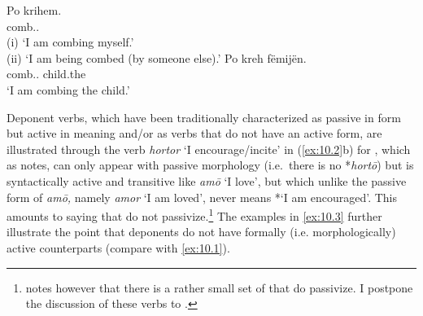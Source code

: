 \documentclass[output=paper]{langsci/langscibook}
\begin{document}
\ea%
\label{ex:10.1} 
    \ea
	\gll    Po    krihem.\\
            \Prog{}  comb.\Fsg.\Nact{}\\
    \glt    (i) ‘I am combing myself.’\\
            (ii) ‘I am being combed (by someone else).’
    \ex
	\gll    Po    kreh        fëmijën.\\
            \Prog{}  comb.\Fsg.\Act{}  child.the\\
    \glt    ‘I am combing the child.’
    \z
\z

Deponent verbs, which have been traditionally characterized as passive in form
but active in meaning and/or as verbs that do not have an active form, are
illustrated through the verb \emph{hortor} ‘I encourage/incite’ in
(\ref{ex:10.2}b) for , which as \citet{Grestenberger2018a} notes, can
only appear with passive morphology (i.e.\ there is no *\emph{hortō}) but is
syntactically active and transitive like \emph{amō} ‘I love’, but which unlike
the passive form of \emph{amō,} namely \emph{amor} ‘I am loved’, never means
*‘I am encouraged’. This amounts to saying that  do not
passivize.\footnote{\textcite{Grestenberger2014,Grestenberger2018a} notes
however that there is a rather small set of  that do
passivize. I postpone the discussion of these verbs to .}
The  examples in \eqref{ex:10.3} further illustrate the point
that deponents do not have formally (i.e. morphologically) active counterparts
(compare with \eqref{ex:10.1}).
\end{document}
